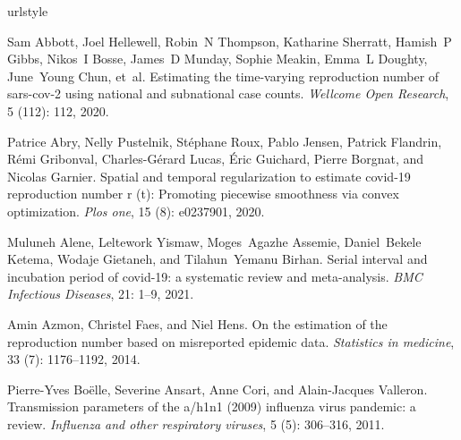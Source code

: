 \documentclass[10pt,letterpaper]{article}
\begin{document}
\begin{thebibliography}{32}
  \providecommand{\natexlab}[1]{#1}
  \providecommand{\url}[1]{\texttt{#1}}
  \expandafter\ifx\csname urlstyle\endcsname\relax
    \providecommand{\doi}[1]{doi: #1}\else
    \providecommand{\doi}{doi: \begingroup \urlstyle{rm}\Url}\fi
  
  Sam Abbott, Joel Hellewell, Robin~N Thompson, Katharine Sherratt, Hamish~P
    Gibbs, Nikos~I Bosse, James~D Munday, Sophie Meakin, Emma~L Doughty,
    June~Young Chun, et~al.
  \newblock Estimating the time-varying reproduction number of sars-cov-2 using
    national and subnational case counts.
  \newblock \emph{Wellcome Open Research}, 5 (112): 112, 2020.
  
  Patrice Abry, Nelly Pustelnik, St{\'e}phane Roux, Pablo Jensen, Patrick
    Flandrin, R{\'e}mi Gribonval, Charles-G{\'e}rard Lucas, {\'E}ric Guichard,
    Pierre Borgnat, and Nicolas Garnier.
  \newblock Spatial and temporal regularization to estimate covid-19 reproduction
    number r (t): Promoting piecewise smoothness via convex optimization.
  \newblock \emph{Plos one}, 15 (8): e0237901, 2020.
  
  Muluneh Alene, Leltework Yismaw, Moges~Agazhe Assemie, Daniel~Bekele Ketema,
    Wodaje Gietaneh, and Tilahun~Yemanu Birhan.
  \newblock Serial interval and incubation period of covid-19: a systematic
    review and meta-analysis.
  \newblock \emph{BMC Infectious Diseases}, 21: 1--9, 2021.
  
  Amin Azmon, Christel Faes, and Niel Hens.
  \newblock On the estimation of the reproduction number based on misreported
    epidemic data.
  \newblock \emph{Statistics in medicine}, 33 (7): 1176--1192,
    2014.
  
  Pierre-Yves Bo{\"e}lle, Severine Ansart, Anne Cori, and Alain-Jacques Valleron.
  \newblock Transmission parameters of the a/h1n1 (2009) influenza virus
    pandemic: a review.
  \newblock \emph{Influenza and other respiratory viruses}, 5
    (5): 306--316, 2011.
  

\end{thebibliography}
\end{document}
